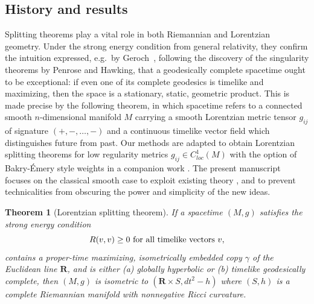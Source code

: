 \documentclass[12pt]{amsart}
\newcommand{\R}{{\mathbf R}}
\newcommand{\re}{\color{red}}
\newcommand{\orange}{\color{orange}}
\newcommand{\gr}{\color{ForestGreen}}
\newtheorem{theorem}{Theorem}
\begin{document}
\subsection{History and results}
Splitting theorems play a vital role in both Riemannian \cite{CheegerEbin98} and Lorentzian~\cite{BeemEhrlichEasley96} geometry.  Under the strong energy condition from general relativity,
they confirm the intuition expressed, e.g.\ by Geroch~\cite{Geroch70}, following the discovery of the singularity theorems \cite{Penrose65a,Hawking66a,HawkingPenrose70} by Penrose and Hawking,
that a geodesically complete spacetime ought to be exceptional: if even one of its complete geodesics is timelike and maximizing, then the space is a stationary, static, geometric product. 
This is made precise by the following theorem, 
in which spacetime refers to a connected smooth $n$-dimensional manifold $M$ carrying a smooth Lorentzian metric tensor $g_{ij}$ 
of signature $(+,-,\ldots,-)$
and a continuous timelike vector field which distinguishes future from past. 
Our methods are adapted to obtain Lorentzian splitting theorems for low regularity metrics $g_{ij} \in C^{1}_{loc}(M)$ with the option of Bakry-\'Emery style weights \cite{Case10} in a companion work \cite{BGMOS25+}.
The present manuscript focuses on the classical smooth case to exploit existing theory \cite{GallowayHorta96,McCann20}, and to prevent technicalities from obscuring the power and simplicity of the new ideas.

\begin{theorem}[Lorentzian splitting theorem]
\label{T:Lorentzian splitting}
If a spacetime $(M,g)$ satisfies the strong energy condition 
\begin{equation}\label{strong energy}
R(v,v) \ge 0\ \mbox{\rm for all timelike vectors}\ v,
\end{equation} 
contains a proper-time maximizing, isometrically embedded copy $\gamma$ of the Euclidean line $\R$,
and is either   (a) globally hyperbolic or (b) timelike geodesically complete,
then $(M,g)$ is isometric to $(\R \times S, dt^2 - h)$ where $(S,h)$ is a complete Riemannian manifold with nonnegative Ricci curvature.
\end{theorem}
\end{document}
